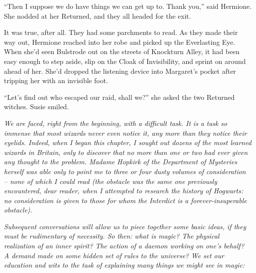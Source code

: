 ``Then I suppose we do have things we can get up to. Thank you,'' said
Hermione. She nodded at her Returned, and they all headed for the exit.

It was true, after all. They had some parchments to read. As they made
their way out, Hermione reached into her robe and picked up the
Everlasting Eye. When she'd seen Bulstrode out on the streets of
Knockturn Alley, it had been easy enough to step aside, slip on the
Cloak of Invisibility, and sprint on around ahead of her. She'd dropped
the listening device into Margaret's pocket after tripping her with an
invisible foot.

``Let's find out who escaped our raid, shall we?'' she asked the two
Returned witches. Susie smiled.

\mybreak

\emph{We are faced, right from the beginning, with a difficult task. It
is a task so immense that most wizards never even notice it, any more
than they notice their eyelids. Indeed, when I began this chapter, I
sought out dozens of the most learned wizards in Britain, only to
discover that no more than one or two had ever given any thought to the
problem. Madame Hopkirk of the Department of Mysteries herself was able
only to point me to three or four dusty volumes of consideration -- none
of which I could read (the obstacle was the same one previously
encountered, dear reader, when I attempted to research the history of
Hogwarts: no consideration is given to those for whom the Interdict is a
forever-insuperable obstacle).}

\emph{Subsequent conversations will allow us to piece together some
basic ideas, if they must be rudimentary of necessity. So then: what is
magic? The physical realization of an inner spirit? The action of a
daemon working on one's behalf? A demand made on some hidden set of
rules to the universe? We set our education and wits to the task of
explaining many things we might see in magic:}

